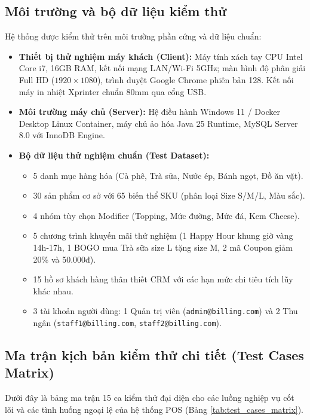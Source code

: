\subsection{Môi trường và bộ dữ liệu kiểm thử}
Hệ thống được kiểm thử trên môi trường phần cứng và dữ liệu chuẩn:
\begin{itemize}[leftmargin=1.5cm]
    \item \textbf{Thiết bị thử nghiệm máy khách (Client):} Máy tính xách tay CPU Intel Core i7, 16GB RAM, kết nối mạng LAN/Wi-Fi 5GHz; màn hình độ phân giải Full HD ($1920\times 1080$), trình duyệt Google Chrome phiên bản 128. Kết nối máy in nhiệt Xprinter chuẩn 80mm qua cổng USB.
    \item \textbf{Môi trường máy chủ (Server):} Hệ điều hành Windows 11 / Docker Desktop Linux Container, máy chủ ảo hóa Java 25 Runtime, MySQL Server 8.0 với InnoDB Engine.
    \item \textbf{Bộ dữ liệu thử nghiệm chuẩn (Test Dataset):}
    \begin{itemize}
        \item 5 danh mục hàng hóa (Cà phê, Trà sữa, Nước ép, Bánh ngọt, Đồ ăn vặt).
        \item 30 sản phẩm cơ sở với 65 biến thể SKU (phân loại Size S/M/L, Màu sắc).
        \item 4 nhóm tùy chọn Modifier (Topping, Mức đường, Mức đá, Kem Cheese).
        \item 5 chương trình khuyến mãi thử nghiệm (1 Happy Hour khung giờ vàng 14h-17h, 1 BOGO mua Trà sữa size L tặng size M, 2 mã Coupon giảm 20\% và 50.000đ).
        \item 15 hồ sơ khách hàng thân thiết CRM với các hạn mức chi tiêu tích lũy khác nhau.
        \item 3 tài khoản người dùng: 1 Quản trị viên (\texttt{admin@billing.com}) và 2 Thu ngân (\texttt{staff1@billing.com}, \texttt{staff2@billing.com}).
    \end{itemize}
\end{itemize}

\subsection{Ma trận kịch bản kiểm thử chi tiết (Test Cases Matrix)}
Dưới đây là bảng ma trận 15 ca kiểm thử đại diện cho các luồng nghiệp vụ cốt lõi và các tình huống ngoại lệ của hệ thống POS (Bảng \ref{tab:test_cases_matrix}).

